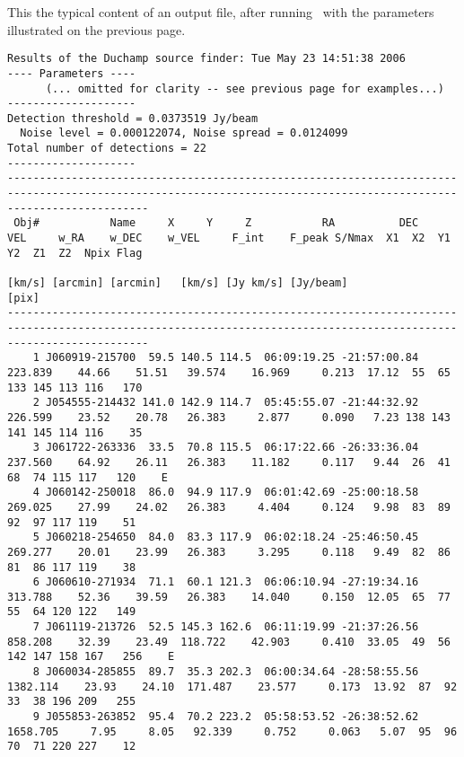 \label{app-output}
This the typical content of an output file, after running \duchamp\
with the parameters illustrated on the previous page. 

{\scriptsize 
  \begin{verbatim}
Results of the Duchamp source finder: Tue May 23 14:51:38 2006
---- Parameters ----
      (... omitted for clarity -- see previous page for examples...)
--------------------
Detection threshold = 0.0373519 Jy/beam
  Noise level = 0.000122074, Noise spread = 0.0124099
Total number of detections = 22
--------------------
------------------------------------------------------------------------------------------------------------------------------------------------------------------
 Obj#           Name     X     Y     Z           RA          DEC      VEL     w_RA    w_DEC    w_VEL     F_int    F_peak S/Nmax  X1  X2  Y1  Y2  Z1  Z2  Npix Flag
                                                                   [km/s] [arcmin] [arcmin]   [km/s] [Jy km/s] [Jy/beam]                                [pix]     
------------------------------------------------------------------------------------------------------------------------------------------------------------------
    1 J060919-215700  59.5 140.5 114.5  06:09:19.25 -21:57:00.84  223.839    44.66    51.51   39.574    16.969     0.213  17.12  55  65 133 145 113 116   170     
    2 J054555-214432 141.0 142.9 114.7  05:45:55.07 -21:44:32.92  226.599    23.52    20.78   26.383     2.877     0.090   7.23 138 143 141 145 114 116    35     
    3 J061722-263336  33.5  70.8 115.5  06:17:22.66 -26:33:36.04  237.560    64.92    26.11   26.383    11.182     0.117   9.44  26  41  68  74 115 117   120    E
    4 J060142-250018  86.0  94.9 117.9  06:01:42.69 -25:00:18.58  269.025    27.99    24.02   26.383     4.404     0.124   9.98  83  89  92  97 117 119    51     
    5 J060218-254650  84.0  83.3 117.9  06:02:18.24 -25:46:50.45  269.277    20.01    23.99   26.383     3.295     0.118   9.49  82  86  81  86 117 119    38     
    6 J060610-271934  71.1  60.1 121.3  06:06:10.94 -27:19:34.16  313.788    52.36    39.59   26.383    14.040     0.150  12.05  65  77  55  64 120 122   149     
    7 J061119-213726  52.5 145.3 162.6  06:11:19.99 -21:37:26.56  858.208    32.39    23.49  118.722    42.903     0.410  33.05  49  56 142 147 158 167   256    E
    8 J060034-285855  89.7  35.3 202.3  06:00:34.64 -28:58:55.56 1382.114    23.93    24.10  171.487    23.577     0.173  13.92  87  92  33  38 196 209   255     
    9 J055853-263852  95.4  70.2 223.2  05:58:53.52 -26:38:52.62 1658.705     7.95     8.05   92.339     0.752     0.063   5.07  95  96  70  71 220 227    12     

\end{verbatim}}
